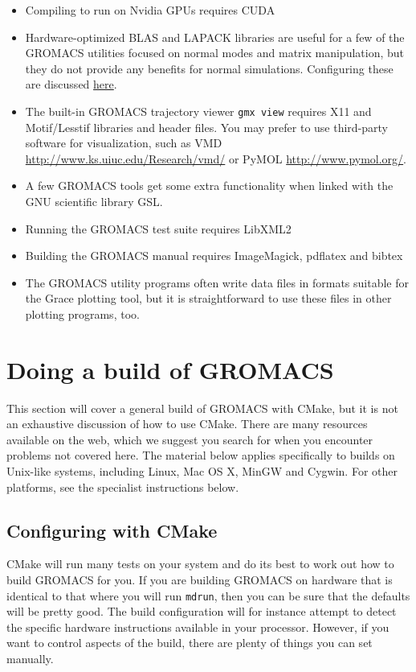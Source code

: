 \documentclass{article}[12pt,a4paper,twoside]
\newcommand{\gromacs}{GROMACS}
\newcommand{\cuda}{CUDA}
\newcommand{\cmake}{CMake}
\newcommand{\blas}{BLAS}
\newcommand{\lapack}{LAPACK}
\newcommand{\vmd}{VMD}
\newcommand{\pymol}{PyMOL}
\newcommand{\grace}{Grace}
\newcommand{\libxmltwo}{LibXML2}
\begin{document}
\begin{itemize}
\item Compiling to run on Nvidia GPUs requires \cuda{}
\item Hardware-optimized \blas{} and \lapack{} libraries are useful
  for a few of the \gromacs{} utilities focused on normal modes and
  matrix manipulation, but they do not provide any benefits for normal
  simulations. Configuring these are discussed
  \hyperlink{linear-algebra}{here}.
\item The built-in \gromacs{} trajectory viewer \verb+gmx view+ requires
  X11 and Motif/Lesstif libraries and header files. You may prefer
  to use third-party software for visualization, such as \vmd{}
  \url{http://www.ks.uiuc.edu/Research/vmd/} or \pymol{}
  \url{http://www.pymol.org/}.
\item A few \gromacs{} tools get some extra functionality when linked with the
GNU scientific library GSL.
\item Running the \gromacs{} test suite requires \libxmltwo{}
\item Building the \gromacs{} manual requires ImageMagick, pdflatex
  and bibtex
\item The \gromacs{} utility programs often write data files in
  formats suitable for the \grace{} plotting tool, but it is
  straightforward to use these files in other plotting programs, too.
\end{itemize}

\section{Doing a build of \gromacs}

This section will cover a general build of \gromacs{} with \cmake{},
but it is not an exhaustive discussion of how to use \cmake{}. There
are many resources available on the web, which we suggest you search
for when you encounter problems not covered here. The material below
applies specifically to builds on Unix-like systems, including Linux,
Mac OS X, MinGW and Cygwin. For other platforms, see the specialist
instructions below.

\subsection{Configuring with \cmake{}}

\cmake{} will run many tests on your system and do its best to work
out how to build \gromacs{} for you. If you are building \gromacs{} on
hardware that is identical to that where you will run \verb+mdrun+,
then you can be sure that the defaults will be pretty good. The build
configuration will for instance attempt to detect the specific hardware
instructions available in your processor. However, if
you want to control aspects of the build, there are plenty of things you
can set manually.
\end{document}
